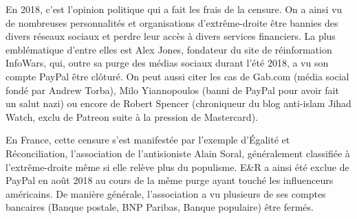
En 2018, c'est l'opinion politique qui a fait les frais de la censure. On a ainsi vu de nombreuses personnalités et organisations d'extrême-droite être bannies des divers réseaux sociaux et perdre leur accès à divers services financiers. La plus emblématique d'entre elles est Alex Jones, fondateur du site de réinformation InfoWars, qui, outre sa purge des médias sociaux durant l'été 2018, a vu son compte PayPal être clôturé. On peut aussi citer les cas de Gab.com (média social fondé par Andrew Torba), Milo Yiannopoulos (banni de PayPal pour avoir fait un salut nazi) ou encore de Robert Spencer (chroniqueur du blog anti-islam Jihad Watch, exclu de Patreon suite à la pression de Mastercard).


En France, cette censure s'est manifestée par l'exemple d'Égalité et Réconciliation, l'association de l'antisioniste Alain Soral, généralement classifiée à l'extrême-droite même si elle relève plus du populisme. E\&R a ainsi été exclue de PayPal en août 2018 au cours de la même purge ayant touché les influenceurs américains. De manière générale, l'association a vu plusieurs de ses comptes bancaires (Banque postale, BNP Paribas, Banque populaire) être fermés.

